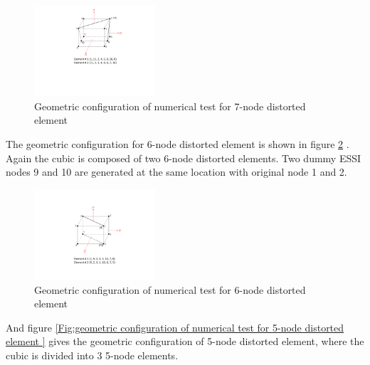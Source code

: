 \documentclass{article}
\begin{document}
\begin{itemize}
\begin{figure}[H]
\begin{center}
\includegraphics[width=0.4\textwidth]{images/distorted_7_node_element.pdf}
\end{center}
\caption{\label{Fig:geometric configuration of numerical test for 7-node distorted element } Geometric configuration of numerical test for 7-node distorted element}
\end{figure}

The geometric configuration for 6-node distorted element is shown in figure \ref{Fig:geometric configuration of numerical test for 6-node distorted element } .
%
Again the cubic is composed of two 6-node distorted elements. 
%
Two dummy ESSI nodes 9 and 10 are generated at the same location with original node 1 and 2.  

\begin{figure}[H]
\begin{center}
\includegraphics[width=0.4\textwidth]{images/distorted_6_node_element.pdf}
\end{center}
\caption{\label{Fig:geometric configuration of numerical test for 6-node distorted element } Geometric configuration of numerical test for 6-node distorted element}
\end{figure}

%
And figure \ref{Fig:geometric configuration of numerical test for 5-node distorted element } gives the geometric configuration of 5-node distorted element, where the cubic is divided into 3 5-node elements.  


\end{itemize}
\end{document}
